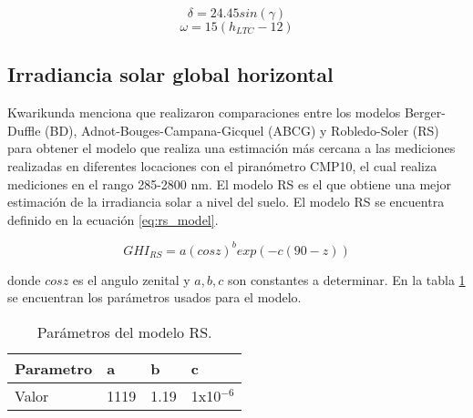 \begin{equation}
	\delta = 24.45 sin(\gamma)
	\label{eq:declination}
\end{equation}
\begin{equation}
	\omega = 15(h_{LTC}-12)
	\label{eq:angle_solar}
\end{equation}


\subsection{Irradiancia solar global horizontal}
Kwarikunda\cite{Kwarikunda_2021} menciona que realizaron comparaciones entre los modelos Berger-Duffle (BD), Adnot-Bouges-Campana-Gicquel (ABCG) y Robledo-Soler (RS) para obtener el modelo que realiza una estimación más cercana a las mediciones realizadas en diferentes locaciones con el piranómetro CMP10, el cual realiza mediciones en el rango 285-2800 nm. El modelo RS es el que obtiene una mejor estimación de la irradiancia solar a nivel del suelo. El modelo RS se encuentra definido en la ecuación \ref{eq:rs_model}.

\begin{equation}
	GHI_{RS} = a(cos z)^b exp(-c(90-z))
	\label{eq:rs_model}
\end{equation}

donde $cos z$ es el angulo zenital y $a,b,c$ son constantes a determinar. En la tabla \ref{table:rs_parameters} se encuentran los parámetros usados para el modelo.

\begin{table}[H]
	\centering
	\begin{tabular}{llll} \hline
		\textbf{Parametro } & \textbf{a} & \textbf{b} & \textbf{c}    \\ \hline
		Valor               & 1119       & 1.19       & 1x10$^{-6  }$ \\ \hline
	\end{tabular}
	\caption{Parámetros del modelo RS.}
	\label{table:rs_parameters}
\end{table}
